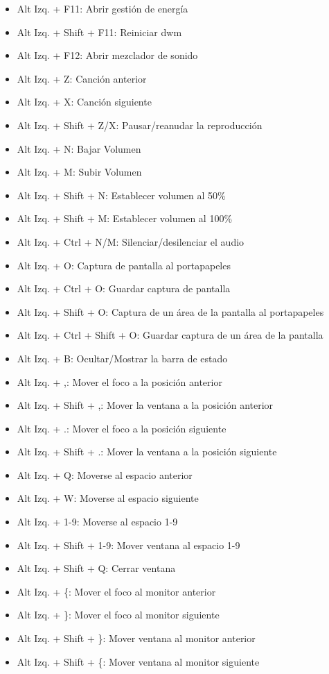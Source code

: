 \documentclass[12pt]{article}
\begin{document}
\begin{itemize}
\item Alt Izq. + F11: Abrir gestión de energía
\item Alt Izq. + Shift + F11: Reiniciar dwm
\item Alt Izq. + F12: Abrir mezclador de sonido
\item Alt Izq. + Z: Canción anterior
\item Alt Izq. + X: Canción siguiente
\item Alt Izq. + Shift + Z/X: Pausar/reanudar la reproducción
\item Alt Izq. + N: Bajar Volumen
\item Alt Izq. + M: Subir Volumen
\item Alt Izq. + Shift + N: Establecer volumen al 50\%
\item Alt Izq. + Shift + M: Establecer volumen al 100\%
\item Alt Izq. + Ctrl + N/M: Silenciar/desilenciar el audio
\item Alt Izq. + O: Captura de pantalla al portapapeles
\item Alt Izq. + Ctrl + O: Guardar captura de pantalla
\item Alt Izq. + Shift + O: Captura de un área de la pantalla al portapapeles
\item Alt Izq. + Ctrl + Shift + O: Guardar captura de un área de la pantalla
\item Alt Izq. + B: Ocultar/Mostrar la barra de estado
\item Alt Izq. + ,: Mover el foco a la posición anterior
\item Alt Izq. + Shift + ,: Mover la ventana a la posición anterior
\item Alt Izq. + .: Mover el foco a la posición siguiente
\item Alt Izq. + Shift + .: Mover la ventana a la posición siguiente
\item Alt Izq. + Q: Moverse al espacio anterior
\item Alt Izq. + W: Moverse al espacio siguiente
\item Alt Izq. + 1-9: Moverse al espacio 1-9
\item Alt Izq. + Shift + 1-9: Mover ventana al espacio 1-9
\item Alt Izq. + Shift + Q: Cerrar ventana
\item Alt Izq. + \{: Mover el foco al monitor anterior
\item Alt Izq. + \}: Mover el foco al monitor siguiente
\item Alt Izq. + Shift + \}: Mover ventana al monitor anterior
\item Alt Izq. + Shift + \{: Mover ventana al monitor siguiente
\end{itemize}
\end{document}
